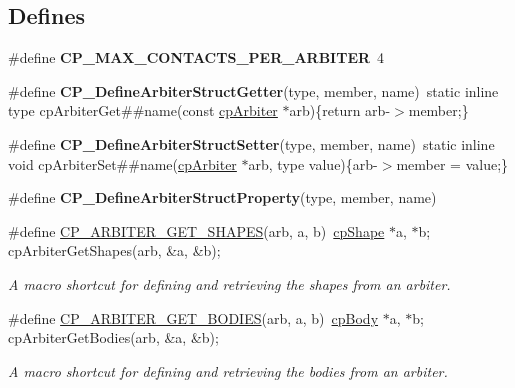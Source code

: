 \subsection*{Defines}
\begin{DoxyCompactItemize}
\item 
\hypertarget{group__cp_arbiter_ga47cf449fcf6338737bc070f29bd286b5}{\#define {\bfseries C\-P\-\_\-\-M\-A\-X\-\_\-\-C\-O\-N\-T\-A\-C\-T\-S\-\_\-\-P\-E\-R\-\_\-\-A\-R\-B\-I\-T\-E\-R}~4}\label{group__cp_arbiter_ga47cf449fcf6338737bc070f29bd286b5}

\item 
\hypertarget{group__cp_arbiter_gae33df68496f0b92af7edaf39b28dfa20}{\#define {\bfseries C\-P\-\_\-\-Define\-Arbiter\-Struct\-Getter}(type, member, name)~static inline type cp\-Arbiter\-Get\#\#name(const \hyperlink{structcp_arbiter}{cp\-Arbiter} $\ast$arb)\{return arb-\/$>$member;\}}\label{group__cp_arbiter_gae33df68496f0b92af7edaf39b28dfa20}

\item 
\hypertarget{group__cp_arbiter_gad7e55326153bcf9de5393425f855efe8}{\#define {\bfseries C\-P\-\_\-\-Define\-Arbiter\-Struct\-Setter}(type, member, name)~static inline void cp\-Arbiter\-Set\#\#name(\hyperlink{structcp_arbiter}{cp\-Arbiter} $\ast$arb, type value)\{arb-\/$>$member = value;\}}\label{group__cp_arbiter_gad7e55326153bcf9de5393425f855efe8}

\item 
\#define {\bfseries C\-P\-\_\-\-Define\-Arbiter\-Struct\-Property}(type, member, name)
\item 
\hypertarget{group__cp_arbiter_ga7644a545351190be1469f5465a0fbfa9}{\#define \hyperlink{group__cp_arbiter_ga7644a545351190be1469f5465a0fbfa9}{C\-P\-\_\-\-A\-R\-B\-I\-T\-E\-R\-\_\-\-G\-E\-T\-\_\-\-S\-H\-A\-P\-E\-S}(arb, a, b)~\hyperlink{structcp_shape}{cp\-Shape} $\ast$a, $\ast$b; cp\-Arbiter\-Get\-Shapes(arb, \&a, \&b);}\label{group__cp_arbiter_ga7644a545351190be1469f5465a0fbfa9}

\begin{DoxyCompactList}\small\item\em A macro shortcut for defining and retrieving the shapes from an arbiter. \end{DoxyCompactList}\item 
\hypertarget{group__cp_arbiter_ga303e1ca856df96c00d62ea5b47477682}{\#define \hyperlink{group__cp_arbiter_ga303e1ca856df96c00d62ea5b47477682}{C\-P\-\_\-\-A\-R\-B\-I\-T\-E\-R\-\_\-\-G\-E\-T\-\_\-\-B\-O\-D\-I\-E\-S}(arb, a, b)~\hyperlink{structcp_body}{cp\-Body} $\ast$a, $\ast$b; cp\-Arbiter\-Get\-Bodies(arb, \&a, \&b);}\label{group__cp_arbiter_ga303e1ca856df96c00d62ea5b47477682}

\begin{DoxyCompactList}\small\item\em A macro shortcut for defining and retrieving the bodies from an arbiter. \end{DoxyCompactList}\end{DoxyCompactItemize}
